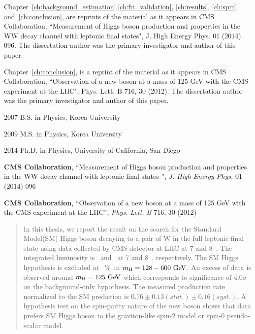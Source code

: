 \begin{frontmatter}
\begin{acknowledgements}
 Chapter~\ref{ch:background_estimation},\ref{ch:fit_validation}, \ref{ch:results},
 \ref{ch:spin} and~\ref{ch:conclusion}, 
 are reprints of the material as it appears in CMS Collaboration, 
 ``Measurement of Higgs boson production and properties in the WW decay channel with 
 leptonic final states", J. High Energy Phys. 01 (2014) 096. 
 The dissertation author was the primary investigator and author of this paper. 

 Chapter~\ref{ch:conclusion},  
 is a reprint of the material as it appears in CMS Collaboration, 
 ``Observation of a new boson at a mass of 125 GeV with the CMS experiment at the LHC", 
 Phys. Lett. B 716, 30 (2012).
 The dissertation author was the primary investigator and author of this paper. 


\end{acknowledgements}


%
%
\begin{vitapage}
\begin{vita}
  \item[2007] B.S. in Physics, Korea University 
  \item[2009] M.S. in Physics, Korea University 
  \item[2014] Ph.D. in Physics, University of California, San Diego 
\end{vita}
\begin{publications}
  \item \textbf{CMS Collaboration}, {``Measurement of Higgs boson production and properties in the WW decay channel with leptonic final states ''}, \emph{J. High Energy Phys.} 01 (2014) 096
  \item \textbf{CMS Collaboration}, {``Observation of a new boson at a mass of 125 GeV with the CMS experiment at the LHC''}, \emph{Phys. Lett. B} 716, 30 (2012) 
\end{publications}
\end{vitapage}


%
%
\begin{abstract}
  In this thesis, we report the result on the search for 
  the Standard Model(SM) Higgs boson decaying to a pair of W in the full leptonic final state
  using data collected by CMS detector at LHC at 7 and 8~\TeV. The integrated luminosity 
  is \intlumiSevenTeV\ and \intlumiEightTeV\ at 7 and 8~\TeV, respectively. 
  The SM Higgs hypothesis is excluded at ~\%\ in $m_{\mathrm{H}}=128-600~\mathrm{Ge\kern -0.1em V}$.   
  An excess of data is observed around $m_{\mathrm{H}}=125~\mathrm{Ge\kern -0.1em V}$ which corresponds to significance 
  of $4.0\sigma$ on the background-only hypothesis. The measured production rate normalized 
  to the SM prediction is $0.76 \pm 0.13(stat.) \pm 0.16(syst.)$. 
  A hypothesis test on the spin-parity nature of the new boson shows that data prefers 
  SM Higgs boson to the graviton-like spin-2 model or spin-0 pseudo-scalar model. 

\end{abstract}


\end{frontmatter}
